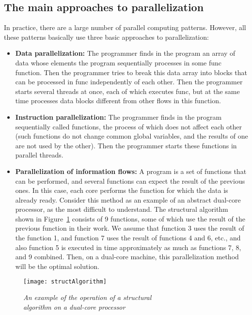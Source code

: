 { %
	\subsection{The main approaches to parallelization}
	\par In practice, there are a large number of parallel computing patterns. However, all these patterns basically use three basic approaches to parallelization:
	\begin{itemize}
		\item\textbf{Data parallelization:} The programmer finds in the program an array of data whose elements the program sequentially processes in some func function. Then the programmer tries to break this data array into blocks that can be processed in func independently of each other. Then the programmer starts several threads at once, each of which executes func, but at the same time processes data blocks different from other flows in this function.
		\item\textbf{Instruction parallelization:} The programmer finds in the program sequentially called functions, the process of which does not affect each other (such functions do not change common global variables, and the results of one are not used by the other). Then the programmer starts these functions in parallel threads.
		\item\textbf{Parallelization of information flows:} A program is a set of functions that can be performed, and several functions can expect the result of the previous ones. In this case, each core performs the function for which the data is already ready. Consider this method as an example of an abstract dual-core processor, as the most difficult to understand. The structural algorithm shown in Figure~\ref{structAlgorithm:image} consists of 9 functions, some of which use the result of the previous function in their work. We assume that function 3 uses the result of the function 1, and function 7 uses the result of functions 4 and 6, etc., and also function 5 is executed in time approximately as much as functions 7, 8, and 9 combined. Then, on a dual-core machine, this parallelization method will be the optimal solution.
	\end{itemize}
	\begin{figure}[H]
		\texttt{[image: structAlgorithm]}
		\caption{\textit{An example of the operation of a structural \\algorithm on a dual-core processor}}
		\label{structAlgorithm:image}
	\end{figure}
}
